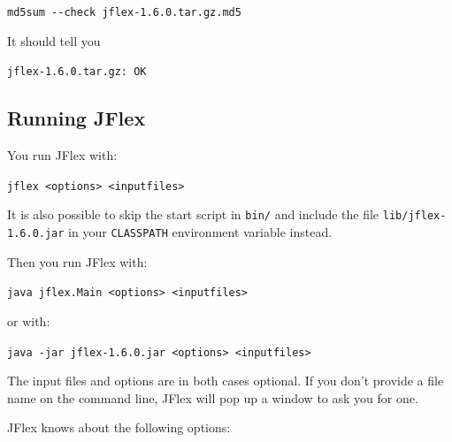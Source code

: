 \documentclass[11pt]{scrartcl}
\newcommand{\longver}{1.6.0}
\begin{document}
\verb+md5sum --check +\texttt{jflex-\longver.tar.gz.md5}

It should tell you

\texttt{jflex-\longver.tar.gz: OK}


\subsection{Running JFlex}
You run JFlex with:

\texttt{jflex <options> <inputfiles>}

It is also possible to skip the start script in \verb+bin/+
and include the file \texttt{lib/jflex-\longver.jar}
in your \texttt{CLASSPATH} environment variable instead.

Then you run JFlex with:

\texttt{java jflex.Main <options> <inputfiles>}

or with:

\texttt{java -jar jflex-\longver.jar <options> <inputfiles>}

The input files and options are in both cases optional. If you don't
provide a file name on the command line, JFlex will pop up a window
to ask you for one.

JFlex knows about the following options:
\end{document}

